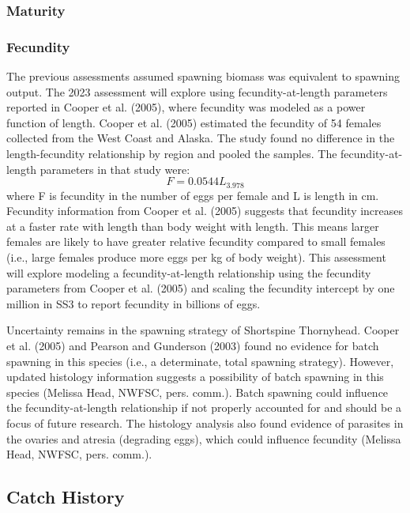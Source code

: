 \documentclass[11pt,
  english,
  letterpaper,
]{article}
\begin{document}
\hypertarget{maturity}{%
\subsubsection{Maturity}\label{maturity}}

\hypertarget{fecundity}{%
\subsubsection{Fecundity}\label{fecundity}}

The previous assessments assumed spawning biomass was equivalent to spawning output. The 2023 assessment will explore using fecundity-at-length parameters reported in Cooper et al. (2005), where fecundity was modeled as a power function of length. Cooper et al. (2005) estimated the fecundity of 54 females collected from the West Coast and Alaska. The study found no difference in the length-fecundity relationship by region and pooled the samples. The fecundity-at-length parameters in that study were: \begin{equation} F = 0.0544L_{3.978} \end{equation} where F is fecundity in the number of eggs per female and L is length in cm. Fecundity information from Cooper et al. (2005) suggests that fecundity increases at a faster rate with length than body weight with length. This means larger females are likely to have greater relative fecundity compared to small females (i.e., large females produce more eggs per kg of body weight). This assessment will explore modeling a fecundity-at-length relationship using the fecundity parameters from Cooper et al. (2005) and scaling the fecundity intercept by one million in SS3 to report fecundity in billions of eggs.

Uncertainty remains in the spawning strategy of Shortspine Thornyhead. Cooper et al. (2005) and Pearson and Gunderson (2003) found no evidence for batch spawning in this species (i.e., a determinate, total spawning strategy). However, updated histology information suggests a possibility of batch spawning in this species (Melissa Head, NWFSC, pers. comm.). Batch spawning could influence the fecundity-at-length relationship if not properly accounted for and should be a focus of future research. The histology analysis also found evidence of parasites in the ovaries and atresia (degrading eggs), which could influence fecundity (Melissa Head, NWFSC, pers. comm.).

\hypertarget{catch-history}{%
\subsection{Catch History}\label{catch-history}}
\end{document}
